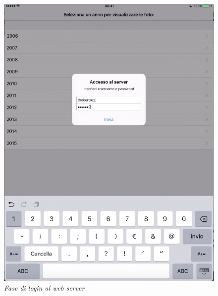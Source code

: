 \begin{figure}[H]
      \centering
      \includegraphics[scale=0.70]{immagini/app_login.jpg}
            \vspace{0.8cm}
            \caption{\textit{Fase di login al web server}}
\end{figure}
